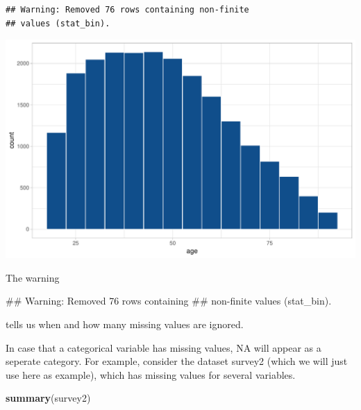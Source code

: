 \documentclass[]{tufte-book}
\newenvironment{Shaded}{}{}
\newcommand{\KeywordTok}[1]{\textcolor[rgb]{0.00,0.44,0.13}{\textbf{#1}}}
\newcommand{\NormalTok}[1]{#1}
\begin{document}
\begin{verbatim}
## Warning: Removed 76 rows containing non-finite
## values (stat_bin).
\end{verbatim}

\includegraphics{cleaning_tutorial_files/figure-latex/unnamed-chunk-50-1}

The warning

\begin{Shaded}
\begin{Highlighting}[]
\NormalTok{## Warning: Removed 76 rows containing}
\NormalTok{## non-finite values (stat_bin).}
\end{Highlighting}
\end{Shaded}

tells us when and how many missing values are ignored.

In case that a categorical variable has missing values, NA will appear
as a seperate category. For example, consider the dataset survey2 (which
we will just use here as example), which has missing values for several
variables.

\begin{Shaded}
\begin{Highlighting}[]
\KeywordTok{summary}\NormalTok{(survey2)}
\end{Highlighting}
\end{Shaded}
\end{document}
